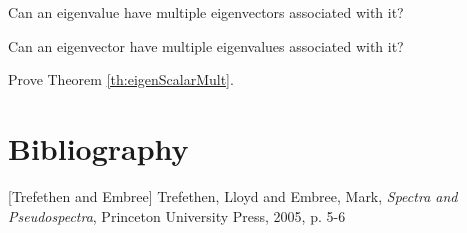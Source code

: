 \documentclass{ximera}
\begin{document}
\begin{problem}\label{prob:eigenmultchoice}
Can an eigenvalue have multiple eigenvectors associated with it?
\begin{multipleChoice}
    \end{multipleChoice}
        
    Can an eigenvector have multiple eigenvalues associated with it?
    \begin{multipleChoice}
    \end{multipleChoice}
\end{problem}
    
\begin{problem}\label{prob:eigenScalarMult}
    Prove Theorem \ref{th:eigenScalarMult}.
\end{problem}
    
\section*{Bibliography}
[Trefethen and  Embree] Trefethen, Lloyd and Embree, Mark, {\it Spectra and Pseudospectra}, Princeton University Press, 2005, p. 5-6
\end{document}
